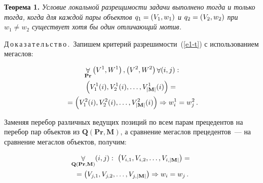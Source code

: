 \begin{multicols}{2}
\medskip

\noindent
\textbf{Теорема 1.} \textit{Условие локальной разрещимости задачи
выполнено тогда и только тогда, когда для каждой пары объектов
$q_1\hm=(V_1,w_1)$ и $q_2\hm=(V_2,w_2)$ при $w_1\not=w_2$ существует
хотя бы один отличающий мотив.}

\medskip

\noindent
Д\,о\,к\,а\,з\,а\,т\,е\,л\,ь\,с\,т\,в\,о\,.\ Запишем критерий
разрешимости~(\ref{e1-t}) с использованием мегаслов:
\addtocounter{equation}{-1}
\renewcommand{\theequation}{\arabic{equation}$^\prime$}
\begin{multline*}
\mathop{\forall}\limits_{\mathbf{Pr}} \left( V^1, W^1\right) , \left( V^2,W^2\right) \mathop{\forall}(i,j):\\
\left( V_1^1(i),V_2^1(i), \ldots , V^1_{\vert \mathbf{M}\vert }(i)\right) ={}\\
{}= \left(
V_1^2(i),V_2^2(i),\ldots , V^2_{\vert \mathbf{M}\vert} (i)\right)\Rightarrow
w_i^1=w_j^2\,.
\end{multline*}
\renewcommand{\theequation}{\arabic{equation}}
\setcounter{equation}{1}

Заменяя перебор различных ведущих позиций по всем парам прецедентов на
перебор пар объектов из $\mathbf{Q}(\mathbf{Pr}, \mathbf{M})$, а сравнение мегаслов
пре\-це\-ден\-тов~--- на
сравнение мегаслов объектов, получим:

\noindent
\begin{multline}
\mathop{\forall}\limits_{\mathbf{Q}(\mathbf{Pr},\mathbf{M})} (i,j):\
\left( V_{i,1}, V_{i,2},\ldots , V_{i,\vert
\mathbf{M}\vert}\right) ={}\\
{}= \left( V_{j,1},V_{j,2},\ldots , V_{j,\vert
\mathbf{M}\vert}\right)\Rightarrow w_i=w_j\,.
\label{e2-t}
\end{multline}


\end{multicols}
